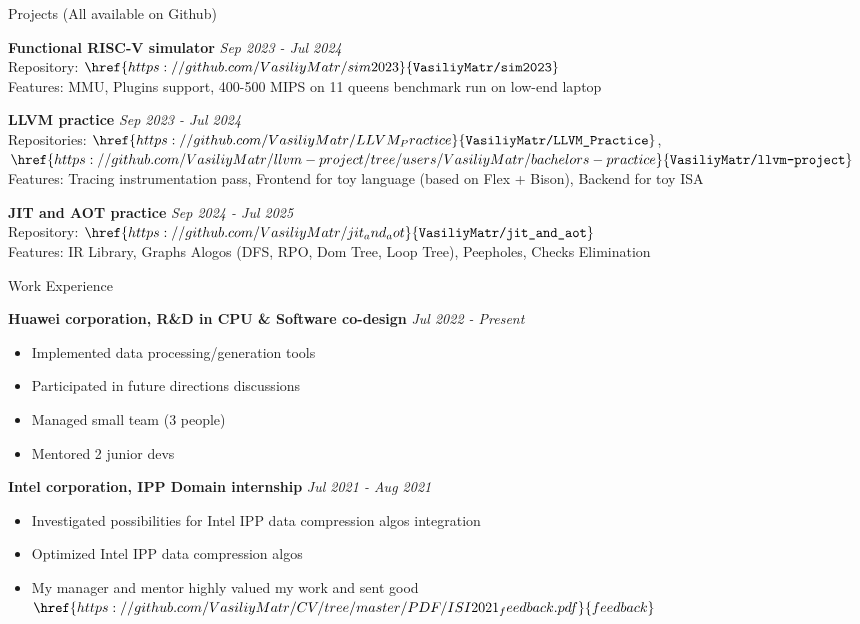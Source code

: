 \documentclass{resume} %
\begin{document}
\begin{rSection}{Projects (All available on Github)}

\textbf{Functional RISC-V simulator} \hfill {\em Sep 2023 - Jul 2024} \\
Repository: $\href{https://github.com/VasiliyMatr/sim2023}{\texttt{VasiliyMatr/sim2023}}$ \\
Features: MMU, Plugins support, 400-500 MIPS on 11 queens benchmark run on low-end laptop

\textbf{LLVM practice} \hfill {\em Sep 2023 - Jul 2024} \\
Repositories: $\href{https://github.com/VasiliyMatr/LLVM_Practice}{\texttt{VasiliyMatr/LLVM\_Practice}}$,
    $\href{https://github.com/VasiliyMatr/llvm-project/tree/users/VasiliyMatr/bachelors-practice}{\texttt{VasiliyMatr/llvm-project}}$ \\
Features: Tracing instrumentation pass, Frontend for toy language (based on Flex + Bison), Backend for toy ISA

\textbf{JIT and AOT practice} \hfill {\em Sep 2024 - Jul 2025} \\
Repository: $\href{https://github.com/VasiliyMatr/jit_and_aot}{\texttt{VasiliyMatr/jit\_and\_aot}}$ \\
Features: IR Library, Graphs Alogos (DFS, RPO, Dom Tree, Loop Tree), Peepholes, Checks Elimination \\

\end{rSection}

\begin{rSection}{Work Experience}

\textbf{Huawei corporation, R\&D in CPU \& Software co-design} \hfill {\em Jul 2022 - Present}
\begin{itemize}
\item Implemented data processing/generation tools
\item Participated in future directions discussions
\item Managed small team (3 people)
\item Mentored 2 junior devs
\end{itemize}

\textbf{Intel corporation, IPP Domain internship} \hfill {\em Jul 2021 - Aug 2021}
\begin{itemize}
\item Investigated possibilities for Intel IPP data compression algos integration
\item Optimized Intel IPP data compression algos
\item My manager and mentor highly valued my work and sent good
    $\href{https://github.com/VasiliyMatr/CV/tree/master/PDF/ISI2021_feedback.pdf}{feedback}$
\end{itemize}

\end{rSection}
\end{document}
